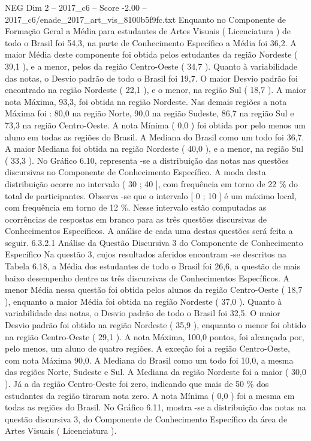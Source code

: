 \begin{textsample}{NEG Dim 2 – 2017\_c6 – Score -2.00 – 2017\_c6/enade\_2017\_art\_vis\_8100b5f9fc.txt}
Enquanto no Componente de Formação Geral a Média para estudantes de Artes Visuais ( Licenciatura ) de todo o Brasil foi 54,3, na parte de Conhecimento Específico a Média foi 36,2.
A maior Média deste componente foi obtida pelos estudantes da região Nordeste ( 39,1 ), e a menor, pelos da região Centro-Oeste ( 34,7 ).
Quanto à variabilidade das notas, o Desvio padrão de todo o Brasil foi 19,7.
O maior Desvio padrão foi encontrado na região Nordeste ( 22,1 ), e o menor, na região Sul ( 18,7 ).
A maior nota Máxima, 93,3, foi obtida na região Nordeste.
Nas demais regiões a nota Máxima foi : 80,0 na região Norte, 90,0 na região Sudeste, 86,7 na região Sul e 73,3 na região Centro-Oeste.
A nota Mínima ( 0,0 ) foi obtida por pelo menos um aluno em todas as regiões do Brasil.
A Mediana do Brasil como um todo foi 36,7.
A maior Mediana foi obtida na região Nordeste ( 40,0 ), e a menor, na região Sul ( 33,3 ).
No Gráfico 6.10, representa -se a distribuição das notas nas questões discursivas no Componente de Conhecimento Específico.
A moda desta distribuição ocorre no intervalo ( 30 ; 40 ], com frequência em torno de 22 \% do total de participantes.
Observa -se que o intervalo [ 0 ; 10 ] é um máximo local, com frequência em torno de 12 \%.
Nesse intervalo estão computadas as ocorrências de respostas em branco para as três questões discursivas de Conhecimentos Específicos.
A análise de cada uma destas questões será feita a seguir. 6.3.2.1 Análise da Questão Discursiva 3 do Componente de Conhecimento Específico Na questão 3, cujos resultados aferidos encontram -se descritos na Tabela 6.18, a Média dos estudantes de todo o Brasil foi 26,6, a questão de mais baixo desempenho dentre as três discursivas de Conhecimentos Específicos.
A menor Média nessa questão foi obtida pelos alunos da região Centro-Oeste ( 18,7 ), enquanto a maior Média foi obtida na região Nordeste ( 37,0 ).
Quanto à variabilidade das notas, o Desvio padrão de todo o Brasil foi 32,5.
O maior Desvio padrão foi obtido na região Nordeste ( 35,9 ), enquanto o menor foi obtido na região Centro-Oeste ( 29,1 ).
A nota Máxima, 100,0 pontos, foi alcançada por, pelo menos, um aluno de quatro regiões.
A exceção foi a região Centro-Oeste, com nota Máxima 90,0.
A Mediana do Brasil como um todo foi 10,0, a mesma das regiões Norte, Sudeste e Sul.
A Mediana da região Nordeste foi a maior ( 30,0 ).
Já a da região Centro-Oeste foi zero, indicando que mais de 50 \% dos estudantes da região tiraram nota zero.
A nota Mínima ( 0,0 ) foi a mesma em todas as regiões do Brasil.
No Gráfico 6.11, mostra -se a distribuição das notas na questão discursiva 3, do Componente de Conhecimento Específico da área de Artes Visuais ( Licenciatura ).

\end{textsample}
